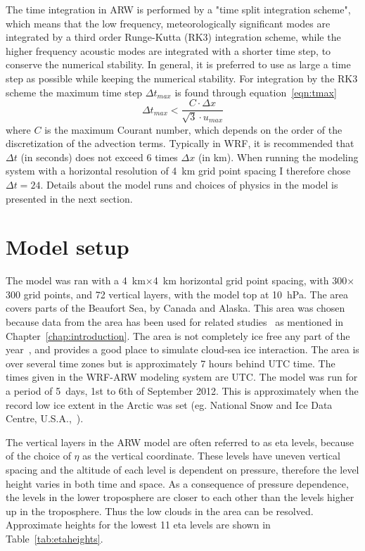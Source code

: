 The time integration in ARW is performed by a "time split integration scheme", which means that the low frequency, meteorologically significant modes are integrated by a third order Runge-Kutta (RK3) integration scheme, while the higher frequency acoustic modes are integrated with a shorter time step, to conserve the numerical stability. In general, it is preferred to use as large a time step as possible while keeping the numerical stability. For integration by the RK3 scheme the maximum time step $\Delta t_{max}$ is found through equation~\ref{eqn:tmax}
\begin{equation}
\Delta t_{max} < \frac{C\cdot \Delta x}{\sqrt{3}\cdot u_{max}}
\label{eqn:tmax}
\end{equation}
where $C$ is the maximum Courant number, which depends on the order of the discretization of the advection terms. Typically in WRF, it is recommended that $\Delta t$ (in seconds) does not exceed 6 times $\Delta x$ (in km). When running the modeling system with a horizontal resolution of 4~km grid point spacing I therefore chose $\Delta t = 24$. Details about the model runs and choices of physics in the model is presented in the next section.

\section{Model setup}
\label{sec:modelsetup}
The model was ran with a 4~km$\times$4~km horizontal grid point spacing, with 300$\times$300 grid points, and 72 vertical layers, with the model top at 10~hPa.
The area covers parts of the Beaufort Sea, by Canada and Alaska. This area was chosen because data from the area has been used for related studies~\citep{Intrieri2002,Shupe2004,Kay2009,Wu2012,Palm2010,Schweiger2008} %
as mentioned in Chapter~\ref{chap:introduction}. The area is not completely ice free any part of the year~\citep{NSIDC}, and provides a good place to simulate cloud-sea ice interaction. The area is over several time zones but is approximately 7 hours behind UTC time. The times given in the WRF-ARW modeling system are UTC. The model was run for a period of 5~days, 1st to 6th of September 2012. This is approximately when the record low ice extent in the Arctic was set (eg. National Snow and Ice Data Centre, U.S.A.,~\citep{NSIDC}).

The vertical layers in the ARW model are often referred to as eta levels, because of the choice of $\eta$ as the vertical coordinate. These levels have uneven vertical spacing and the altitude of each level is dependent on pressure, therefore the level height varies in both time and space. As a consequence of pressure dependence, the levels in the lower troposphere are closer to each other than the levels higher up in the troposphere. Thus the low clouds in the area can be resolved. Approximate heights for the lowest 11 eta levels are shown in Table~\ref{tab:etaheights}.

